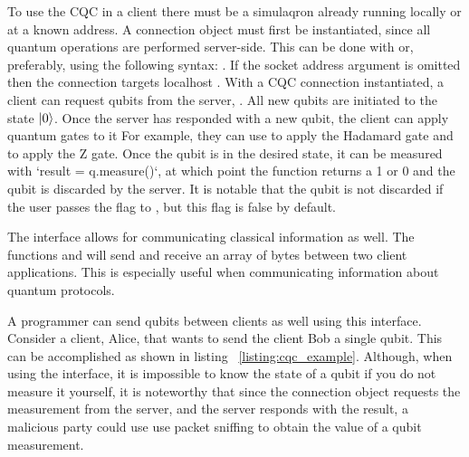 To use the CQC in a client there must be a simulaqron already running locally or at a known address.
A connection object must first be instantiated, since all quantum operations are performed server-side.
This can be done with 
or, preferably, using the following syntax: 
.
If the socket address argument is omitted then the connection targets localhost \cite{simulaqron}.
With a CQC connection instantiated, a client can request qubits from the server, .
All new qubits are initiated to the state $\ket{0}$.
Once the server has responded with a new qubit, the client can apply quantum gates to it
For example, they can use  to apply the Hadamard gate and  to apply the Z gate. 
Once the qubit is in the desired state, it can be measured with `result = q.measure()`, at which point the function returns a 1 or 0 and the qubit is discarded by the server.
It is notable that the qubit is not discarded if the user passes the flag  to  , but this flag is false by default.

The interface allows for communicating classical information as well.
The functions  and  will send and receive an array of bytes between two client applications. This is especially useful when communicating information about quantum protocols.

A programmer can send qubits between clients as well using this interface.
Consider a client, Alice, that wants to send the client Bob a single qubit.
This can be accomplished as shown in listing ~\ref{listing:cqc_example}.
Although, when using the interface, it is impossible to know the state of a qubit if you do not measure it yourself, it is noteworthy that since the connection object requests the measurement from the server, and the server responds with the result, a malicious party could use use packet sniffing to obtain the value of a qubit measurement.

\noindent
\begin{minipage}{\linewidth}
\begin{singlespace}

\end{singlespace}
\end{minipage}

